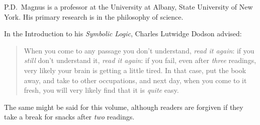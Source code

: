 P.D.\ Magnus is a professor at the University at Albany, State University of New York. His primary research is in the philosophy of science. 




\vfill

In the Introduction to his \emph{Symbolic Logic}, Charles Lutwidge Dodson advised: \begin{quote}
	When you come to any passage you don't understand, \emph{read it again}: if you \emph{still} don't understand it, \emph{read it again}: if you fail, even after \emph{three} readings, very likely your brain is getting a little tired. In that case, put the book away, and take to other occupations, and next day, when you come to it fresh, you will very likely find that it is \emph{quite} easy.
\end{quote}



The same might be said for this volume, although readers are forgiven if they take a break for snacks after \emph{two} readings.




